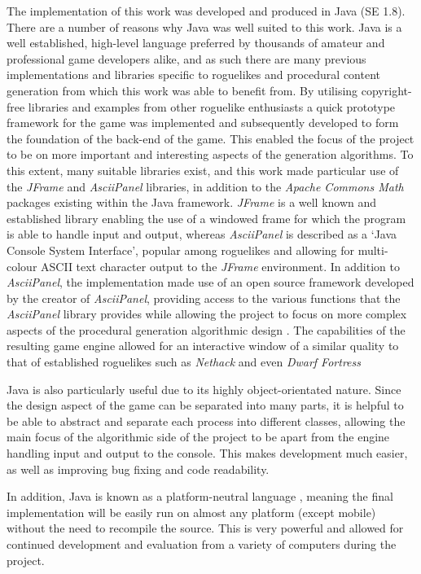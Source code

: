 \documentclass[12pt,a4paper]{article}
\begin{document}
The implementation of this work was developed and produced in Java (SE 1.8). There are a number of reasons why Java was well suited to this work. Java is a well established, high-level language preferred by thousands of amateur and professional game developers alike, and as such there are many previous implementations and libraries specific to roguelikes and procedural content generation from which this work was able to benefit from. By utilising copyright-free libraries and examples from other roguelike enthusiasts a quick prototype framework for the game was implemented and subsequently developed to form the foundation of the back-end of the game. This enabled the focus of the project to be on more important and interesting aspects of the generation algorithms. To this extent, many suitable libraries exist, and this work made particular use of the \emph{JFrame} and \emph{AsciiPanel} libraries, in addition to the \emph{Apache Commons Math} packages existing within the Java framework. \emph{JFrame} is a well known and established library enabling the use of a windowed frame for which the program is able to handle input and output, whereas \emph{AsciiPanel} is described as a `Java Console System Interface', popular among roguelikes and allowing for multi-colour ASCII text character output to the \emph{JFrame} environment. In addition to \emph{AsciiPanel}, the implementation made use of an open source framework developed by the creator of \emph{AsciiPanel}, providing access to the various functions that the \emph{AsciiPanel} library provides while allowing the project to focus on more complex aspects of the procedural generation algorithmic design \cite{trystan}. The capabilities of the resulting game engine allowed for an interactive window of a similar quality to that of established roguelikes such as \emph{Nethack} and even \emph{Dwarf Fortress}

Java is also particularly useful due to its highly object-orientated nature. Since the design aspect of the game can be separated into many parts, it is helpful to be able to abstract and separate each process into different classes, allowing the main focus of the algorithmic side of the project to be apart from the engine handling input and output to the console. This makes development much easier, as well as improving bug fixing and code readability.

In addition, Java is known as a platform-neutral language \cite{java}, meaning the final implementation will be easily run on almost any platform (except mobile) without the need to recompile the source. This is very powerful and allowed for continued development and evaluation from a variety of computers during the project. 
\end{document}
